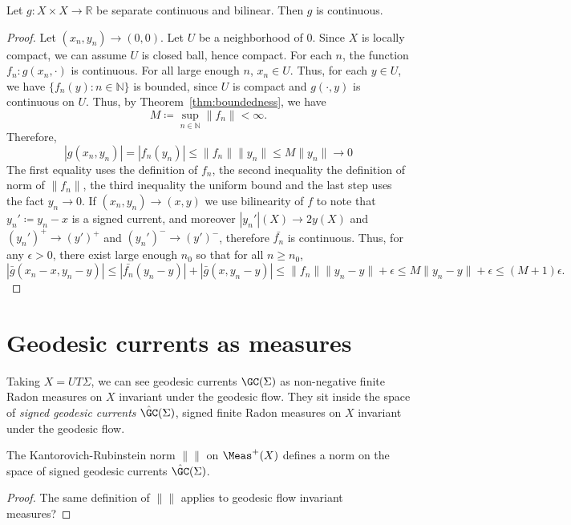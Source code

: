 \begin{theorem}
Let $g \colon X \times X \to \mathbb{R}$ be separate continuous and bilinear.
Then $g$ is continuous.
\end{theorem}
\begin{proof}
Let $(x_n,y_n) \to (0,0)$.
Let $U$ be a neighborhood of $0$.
Since $X$ is locally compact, we can assume $U$ is closed ball, hence compact.
For each $n$, the function $f_n \colon g(x_n, \cdot )$ is continuous.
For all large enough $n$, $x_n \in U$.
Thus, for each $y \in U$, we have $\{ f_n(y) \colon n \in \mathbb{N} \}$ is bounded, since $U$ is compact and $g(\cdot,y)$ is continuous on $U$.
Thus, by Theorem~\ref{thm:boundedness}, we have
\[
  M\coloneqq \sup_{n \in \mathbb{N}} \| f_n \| < \infty.
\]
Therefore,
\[
  |g(x_n,y_n)| = |f_n(y_n)| \leq \|f_n \| \| y_n\| \leq M \|y_n\| \to 0
\]
The first equality uses the definition of $f_n$, the second inequality the definition of norm of $\| f_n \|$, the third inequality the uniform bound and the last step uses the fact $y_n \to 0$.
If $(x_n,y_n) \to (x,y)$ we use bilinearity of $f$ to note that
$y_n' \coloneqq y_n-x$ is a signed current, and moreover $|y_n'|(X) \to 2y(X)$ and $(y_n')^+ \to (y')^+$ and $(y_n')^- \to (y')^-$, therefore $\bar{f_n}$ is continuous. Thus, for any $\epsilon>0$, there exist large enough $n_0$ so that for all $n \geq n_0$,
\[
  |\bar{g}(x_n-x,y_n-y)| \leq |\bar{f_n}(y_n-y)| + |\bar{g}(x,y_n-y)| \leq \|f_n \| \| y_n-y\| + \epsilon \leq M \|y_n-y\| + \epsilon \leq (M+1)\epsilon.
\]
\end{proof}




\section{Geodesic currents as measures}


Taking $X=UT\Sigma$, we can see geodesic currents $\GC(\Sigma)$ as non-negative finite Radon measures on $X$ invariant under the geodesic flow. They sit inside the space of \emph{signed geodesic currents} $\hat{\GC}(\Sigma)$, signed finite Radon measures on $X$ invariant under the geodesic flow.

\begin{claim}
The Kantorovich-Rubinstein norm $\| \|$ on $\Meas^+(X)$ defines a norm on the space of signed geodesic currents $\hat{\GC}(\Sigma)$.
\end{claim}
\begin{proof}
The same definition of $\| \|$ applies to geodesic flow invariant measures?
\end{proof}

